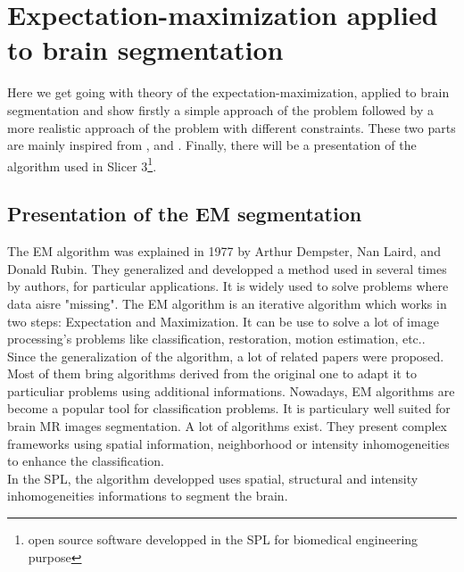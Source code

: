 \chapter{Expectation-maximization applied to brain segmentation}\label{sec:EM}
%
Here we get going with theory of the expectation-maximization, applied to brain segmentation and show firstly a simple approach of the problem followed by a
more realistic approach of the problem with different constraints. These two parts are mainly inspired from \cite{4}, \cite{5} and \cite{6}. Finally, there will be a presentation of the algorithm used in Slicer 3\footnote{open source software developped in the SPL for biomedical engineering purpose}.
%
\section{Presentation of the EM segmentation}
The EM algorithm was explained in 1977 by Arthur Dempster, Nan Laird, and Donald Rubin\cite{1}. They generalized and developped a method used in several times by authors, for particular applications. It is widely used to solve problems where data aisre "missing".
The EM algorithm is an iterative algorithm which works in two steps: Expectation and Maximization. It can be use to solve a lot of image processing's problems like classification, restoration\cite{3}, motion estimation\cite{2}, etc.. 
Since the generalization of the algorithm, a lot of related papers were proposed. Most of them bring algorithms derived from the original one to adapt it to particuliar problems using additional informations.
Nowadays, EM algorithms are become a popular tool for classification problems.  It is particulary well suited for brain MR images segmentation.
A lot of algorithms exist. They present complex frameworks using spatial information, neighborhood or intensity inhomogeneities to enhance the classification.\\
In the SPL, the algorithm developped uses spatial, structural and intensity inhomogeneities informations to segment the brain. 
%

